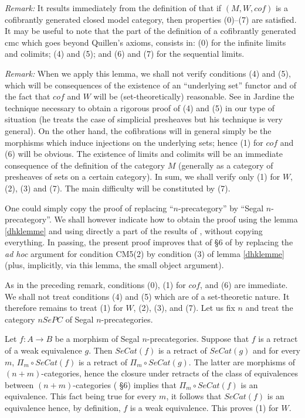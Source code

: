 {\em Remark:} It results immediately from the definition of
\cite{Hirschhorn}
\cite{DHK} that if $(M, W, cof)$ is a cofibrantly generated closed model
category, then properties (0)--(7) are satisfied.
It may be useful to note that the part of the definition of a cofibrantly
generated cmc
which goes beyond
Quillen's axioms, consists in: (0) for the infinite limits and colimits; (4)
and (5); and
(6) and (7) for the sequential limits.


{\em Remark:} When we apply this lemma, we shall not verify
conditions (4) and (5), which will be consequences of the existence of an
``underlying set'' functor and of the fact that $cof$ and $W$ will be
(set-theoretically)
reasonable.
See in Jardine \cite{Jardine} the technique necessary to obtain a rigorous
proof
of (4) and (5) in our type of situation (he treats the case of simplicial
presheaves
but his technique is very general).
On the other hand, the cofibrations will in
general simply be the morphisms which induce injections on the
underlying sets; hence (1) for $cof$ and (6) will be obvious.
The existence of limits and colimits will be an immediate consequence of the
definition of the category $M$ (generally as a category of
presheaves of sets on a certain category).  In sum, we shall
verify only (1) for $W$, (2), (3) and (7). The main difficulty will be
constituted by (7).




One could simply copy the proof of \cite{nCAT}
replacing ``$n$-precategory'' by ``Segal $n$-precategory''. We shall
however indicate how to obtain the proof using the lemma
\ref{dhklemme} and using directly a part of the results of
\cite{nCAT}, without copying everything. In passing, the present
proof improves that of \S 6 of \cite{nCAT} by replacing
the {\em ad hoc} argument for condition  CM5(2) by condition (3) of lemma
\ref{dhklemme} (plus, implicitly, via this lemma, the small object argument).

As in the preceding remark, conditions (0), (1) for $cof$,
and (6) are immediate. We shall not treat conditions (4) and (5)
which are of a set-theoretic nature. It therefore remains to treat (1) for
$W$, (2), (3), and (7). Let us fix $n$ and treat the category $nSePC$ of
Segal $n$-precategories.

Let $f:A\rightarrow B$ be a morphism of Segal $n$-precategories.
Suppose that $f$ is a retract of a weak equivalence $g$.  Then
$SeCat(f)$ is a retract of $SeCat(g)$ and for every $m$, $\Pi _m \circ
SeCat(f)$ is a retract of $\Pi _m \circ SeCat(g)$. The latter are
morphisms of $(n+m)$-categories, hence the closure under retracts of the
class of equivalences between $(n+m)$-categories  (\cite{nCAT} \S 6) implies
that $\Pi _m \circ SeCat(f)$ is an equivalence. This fact being true
for every $m$, it
follows that $SeCat(f)$ is an equivalence hence, by definition, $f$ is
a weak equivalence. This proves (1) for $W$.

